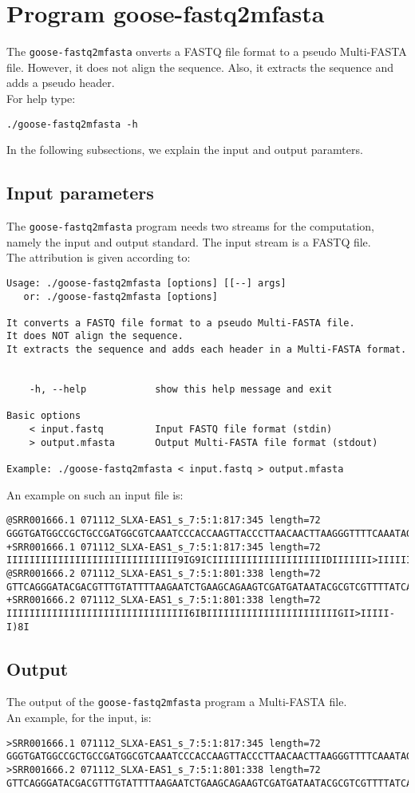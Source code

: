 \section{Program goose-fastq2mfasta}
The \texttt{goose-fastq2mfasta} onverts a FASTQ file format to a pseudo Multi-FASTA file. However, it does not align the sequence. Also, it extracts the sequence and adds a pseudo header.\\
For help type:
\begin{lstlisting}
./goose-fastq2mfasta -h
\end{lstlisting}
In the following subsections, we explain the input and output paramters.

\subsection*{Input parameters}

The \texttt{goose-fastq2mfasta} program needs two streams for the computation,
namely the input and output standard. The input stream is a FASTQ file.\\
The attribution is given according to:
\begin{lstlisting}
Usage: ./goose-fastq2mfasta [options] [[--] args]
   or: ./goose-fastq2mfasta [options]

It converts a FASTQ file format to a pseudo Multi-FASTA file.
It does NOT align the sequence.
It extracts the sequence and adds each header in a Multi-FASTA format.


    -h, --help            show this help message and exit

Basic options
    < input.fastq         Input FASTQ file format (stdin)
    > output.mfasta       Output Multi-FASTA file format (stdout)

Example: ./goose-fastq2mfasta < input.fastq > output.mfasta
\end{lstlisting}
An example on such an input file is:
\begin{lstlisting}
@SRR001666.1 071112_SLXA-EAS1_s_7:5:1:817:345 length=72
GGGTGATGGCCGCTGCCGATGGCGTCAAATCCCACCAAGTTACCCTTAACAACTTAAGGGTTTTCAAATAGA
+SRR001666.1 071112_SLXA-EAS1_s_7:5:1:817:345 length=72
IIIIIIIIIIIIIIIIIIIIIIIIIIIIII9IG9ICIIIIIIIIIIIIIIIIIIIIDIIIIIII>IIIIII/
@SRR001666.2 071112_SLXA-EAS1_s_7:5:1:801:338 length=72
GTTCAGGGATACGACGTTTGTATTTTAAGAATCTGAAGCAGAAGTCGATGATAATACGCGTCGTTTTATCAT
+SRR001666.2 071112_SLXA-EAS1_s_7:5:1:801:338 length=72
IIIIIIIIIIIIIIIIIIIIIIIIIIIIIIII6IBIIIIIIIIIIIIIIIIIIIIIIIGII>IIIII-I)8I
\end{lstlisting}

\subsection*{Output}
The output of the \texttt{goose-fastq2mfasta} program a Multi-FASTA file.\\
An example, for the input, is:
\begin{lstlisting}
>SRR001666.1 071112_SLXA-EAS1_s_7:5:1:817:345 length=72
GGGTGATGGCCGCTGCCGATGGCGTCAAATCCCACCAAGTTACCCTTAACAACTTAAGGGTTTTCAAATAGA
>SRR001666.2 071112_SLXA-EAS1_s_7:5:1:801:338 length=72
GTTCAGGGATACGACGTTTGTATTTTAAGAATCTGAAGCAGAAGTCGATGATAATACGCGTCGTTTTATCAT
\end{lstlisting}
